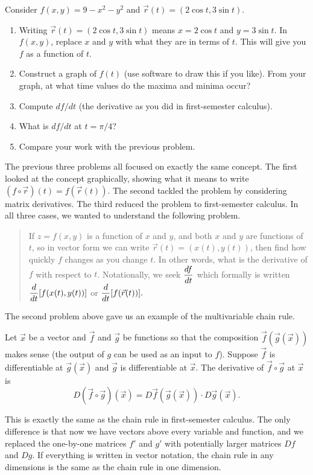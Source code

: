 \begin{problem}
 Consider $f(x,y)=9-x^2-y^2$ and $\vec r(t)=(2\cos t, 3\sin t)$.
\begin{enumerate}
 \item Writing $\vec r(t)=(2\cos t, 3\sin t)$ means $x=2\cos t$ and $y=3\sin t$. In $f(x,y)$, replace $x$ and $y$ with what they are in terms of $t$. This will give you $f$ as a function of $t$. 
 \item Construct a graph of $f(t)$ (use software to draw this if you like). From your graph, at what time values do the maxima and minima occur?
 \item Compute $df/dt$ (the derivative as you did in first-semester calculus).
 \item What is $df/dt$ at $t=\pi/4$?
 \item Compare your work with the previous problem.
\end{enumerate}
\end{problem}

The previous three problems all focused on exactly the same concept.  The first looked at the concept graphically, showing  what it means to write $(f\circ \vec r)(t)=f(\vec r(t))$. The second tackled the problem by considering matrix derivatives.  The third reduced the problem to first-semester calculus.  In all three cases, we wanted to understand the following problem.
\begin{quote}
 If $z=f(x,y)$ is a function of $x$ and $y$, and both $x$ and $y$ are functions of $t$, so in vector form we can write $\vec r(t)=(x(t),y(t))$, then find how quickly $f$ changes as you change $t$. In other words, what is the derivative of $f$ with respect to $t$. Notationally, we seek $\displaystyle \frac{df}{dt}$ which formally is written $\displaystyle \frac{d}{dt}[f(x(t),y(t))]$ or $\displaystyle \frac{d}{dt} [f(\vec r(t))].$
\end{quote}
The second problem above gave us an example of the multivariable chain rule.
\begin{theorem}
 Let $\vec x$ be a vector and $\vec f$ and $\vec g$ be functions so that the composition $\vec f(\vec g(\vec x))$ makes sense (the output of $g$ can be used as an input to $f$). Suppose $\vec f$ is differentiable at $\vec g(\vec x)$ and $\vec g$ is differentiable at $\vec x$. The derivative of $\vec f\circ \vec g$ at $\vec x$ is 
$$D(\vec f\circ \vec g)(\vec x) = D\vec f(\vec g(\vec x))\cdot D\vec g(\vec x).$$
\end{theorem}
This is exactly the same as the chain rule in first-semester calculus.  The only difference is that now we have vectors above every variable and function, and we replaced the one-by-one matrices $f'$ and $g'$ with potentially larger matrices $Df$ and $Dg$. If everything is written in vector notation, the chain rule in any dimensions is the same as the chain rule in one dimension.

